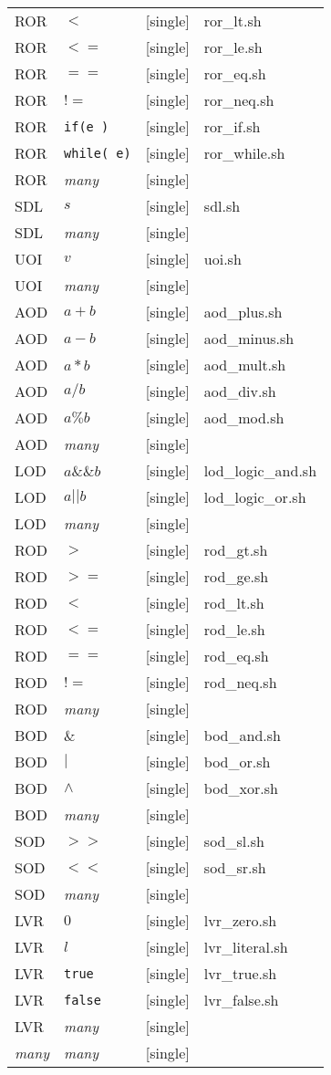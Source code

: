 \begin{table}[h]
\begin{tabular}{|llll|}
ROR	&	$<$	&	[single]	&	ror\_lt.sh \\
ROR	&	$<=$	&	[single]	&	ror\_le.sh \\
ROR	&	$==$	&	[single]	&	ror\_eq.sh \\
ROR	&	$!=$	&	[single]	&	ror\_neq.sh \\
ROR	&	\texttt{if(e )}	&	[single]	&	ror\_if.sh \\
ROR	&	\texttt{while( e)}	&	[single]&	ror\_while.sh \\
ROR	&	\textit{many}&	[single]&	 \\
SDL	&	$s$	&	[single]	&	sdl.sh \\
SDL	&	\textit{many}	&	[single]	&	 \\
UOI	&	$v$	&	[single]	&	uoi.sh \\
UOI	&	\textit{many}	&	[single]	&	 \\
AOD	&	$a + b$	&	[single]	&	aod\_plus.sh \\
AOD	&	$a - b$	&	[single]	&	aod\_minus.sh \\
AOD	&	$a * b$	&	[single]	&	aod\_mult.sh \\
AOD	&	$a / b$	&	[single]	&	aod\_div.sh \\
AOD	&	$a \% b$	&	[single]	&	aod\_mod.sh \\
AOD	&	\textit{many}	&	[single]	&	 \\
LOD	&	$a \&\& b$	&	[single]	&	lod\_logic\_and.sh \\
LOD	&	$a || b$	&	[single]	&	lod\_logic\_or.sh \\
LOD	&	\textit{many}	&	[single]	&	 \\
ROD	&	$>$	&	[single]	&	rod\_gt.sh \\
ROD	&	$>=$	&	[single]	&	rod\_ge.sh \\
ROD	&	$<$	&	[single]	&	rod\_lt.sh \\
ROD	&	$<=$	&	[single]	&	rod\_le.sh \\
ROD	&	$==$	&	[single]	&	rod\_eq.sh \\
ROD	&	$!=$	&	[single]	&	rod\_neq.sh \\
ROD	&	\textit{many}	&	[single]	&	 \\
BOD	&	$\&$	&	[single]	&	bod\_and.sh \\
BOD	&	$|$	&	[single]	&	bod\_or.sh \\
BOD	&	$\land$	&	[single]	&	bod\_xor.sh \\
BOD	&	\textit{many}	&	[single]	&	 \\
SOD	&	$>>$	&	[single]	&	sod\_sl.sh \\
SOD	&	$<<$	&	[single]	&	sod\_sr.sh \\
SOD	&	\textit{many}	&	[single]	&	 \\
LVR	&	$0$	&	[single]	&	lvr\_zero.sh \\
LVR	&	$l$	&	[single]	&	lvr\_literal.sh \\
LVR	&	\texttt{true}	&	[single]	&	lvr\_true.sh \\
LVR	&	\texttt{false}	&	[single]	&	lvr\_false.sh \\
LVR	&	\textit{many}	&	[single]	&	 \\
\textit{many}	&	\textit{many}	&	[single]	&	 \\
\hline
\end{tabular}
\end{table}